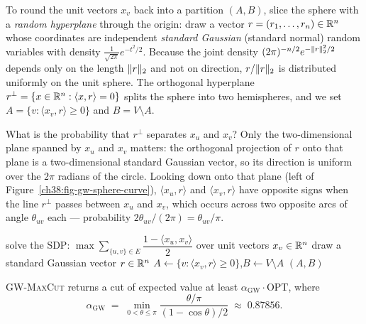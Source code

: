 To round the unit vectors $x_v$ back into a partition $(A,B)$, slice the sphere with a \emph{random
hyperplane} through the origin: draw a vector $r = (r_1,\dots,r_n)\in\mathbb{R}^n$ whose coordinates are
independent \emph{standard Gaussian} (standard normal) random variables with density
$\tfrac{1}{\sqrt{2\pi}}e^{-t^2/2}$. Because the joint density $(2\pi)^{-n/2}e^{-\lVert r\rVert_2^2/2}$ depends
only on the length $\lVert r\rVert_2$ and not on direction, $r/\lVert r\rVert_2$ is distributed uniformly on the unit
sphere. The orthogonal hyperplane $r^\perp = \{x\in\mathbb{R}^n : \langle x,r\rangle = 0\}$ splits the sphere
into two hemispheres, and we set $A = \{v : \langle x_v, r\rangle \ge 0\}$ and $B = V\setminus A$.

What is the probability that $r^\perp$ separates $x_u$ and $x_v$? Only the two-dimensional plane spanned
by $x_u$ and $x_v$ matters: the orthogonal projection of $r$ onto that plane is a two-dimensional standard
Gaussian vector, so its direction is uniform over the $2\pi$ radians of the circle. Looking down onto that
plane (left of Figure~\ref{ch38:fig-gw-sphere-curve}), $\langle x_u,r\rangle$ and $\langle x_v,r\rangle$
have opposite signs when the line $r^\perp$ passes between $x_u$ and $x_v$, which occurs across two
opposite arcs of angle $\theta_{uv}$ each --- probability $2\theta_{uv}/(2\pi) = \theta_{uv}/\pi$.

\begin{algorithm}[H]
\caption{\textsc{GW-MaxCut}$(\Gph)$}\label{ch38:alg-gw}
\DontPrintSemicolon
solve the SDP: $\max \sum_{\{u,v\}\in E}\dfrac{1-\langle x_u,x_v\rangle}{2}$ over unit vectors $x_v\in\mathbb{R}^n$\;
draw a standard Gaussian vector $r\in\mathbb{R}^n$\;
$A \gets \{v: \langle x_v, r\rangle \ge 0\}$,\quad $B \gets V\setminus A$\;
\Return $(A,B)$\;
\end{algorithm}

\begin{theorem}\label{ch38:thm-gw}
\textup{\textsc{GW-MaxCut}} returns a cut of expected value at least $\alpha_{\mathrm{GW}}\cdot\mathrm{OPT}$,
where
\[
  \alpha_{\mathrm{GW}} \;=\; \min_{0<\theta\le\pi}\frac{\theta/\pi}{(1-\cos\theta)/2}
  \;\approx\; 0.87856.
\]
\end{theorem}

